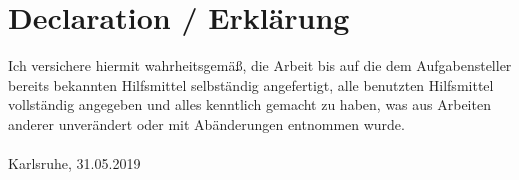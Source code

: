 
\chapter*{Declaration / Erkl\"arung}
Ich versichere hiermit wahrheitsgemäß, die Arbeit bis auf die dem Aufgabensteller bereits bekannten Hilfsmittel selbständig angefertigt,
alle benutzten Hilfsmittel vollständig angegeben und alles kenntlich gemacht zu haben, was aus Arbeiten anderer unverändert oder mit Abänderungen entnommen wurde.\\

\vspace{2cm}
\myname \\
Karlsruhe, 31.05.2019\\
